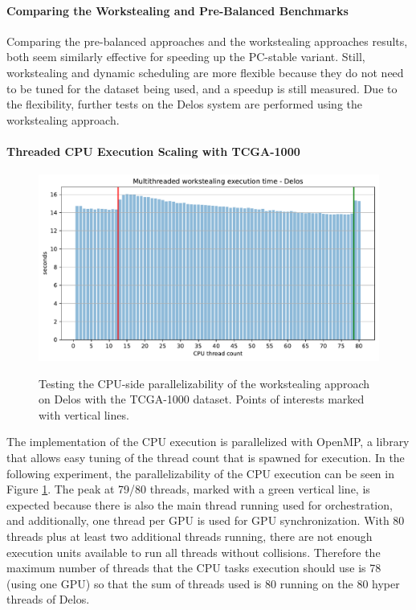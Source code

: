 \paragraph{Comparing the Workstealing and Pre-Balanced Benchmarks}
Comparing the pre-balanced approaches and the workstealing approaches results, both seem similarly effective for speeding up the PC-stable variant. Still, workstealing and dynamic scheduling are more flexible because they do not need to be tuned for the dataset being used, and a speedup is still measured. Due to the flexibility, further tests on the Delos system are performed using the workstealing approach.

\paragraph{Threaded CPU Execution Scaling with TCGA-1000}
\begin{figure}[H]
  \caption{Testing the CPU-side parallelizability of the workstealing approach on Delos with the TCGA-1000 dataset. Points of interests marked with vertical lines.}
  \includegraphics[width=\textwidth]{figures/threaded_wsteal.pdf}
  \centering
  \label{fig:wstealing_threaded_delos}
\end{figure}

The implementation of the CPU execution is parallelized with OpenMP, a library that allows easy tuning of the thread count that is spawned for execution. In the following experiment, the parallelizability of the CPU execution can be seen in Figure \ref{fig:wstealing_threaded_delos}.
The peak at 79/80 threads, marked with a green vertical line, is expected because there is also the main thread running used for orchestration, and additionally, one thread per GPU is used for GPU synchronization. With 80 threads plus at least two additional threads running, there are not enough execution units available to run all threads without collisions. Therefore the maximum number of threads that the CPU tasks execution should use is 78 (using one GPU) so that the sum of threads used is 80 running on the 80 hyper threads of Delos.


